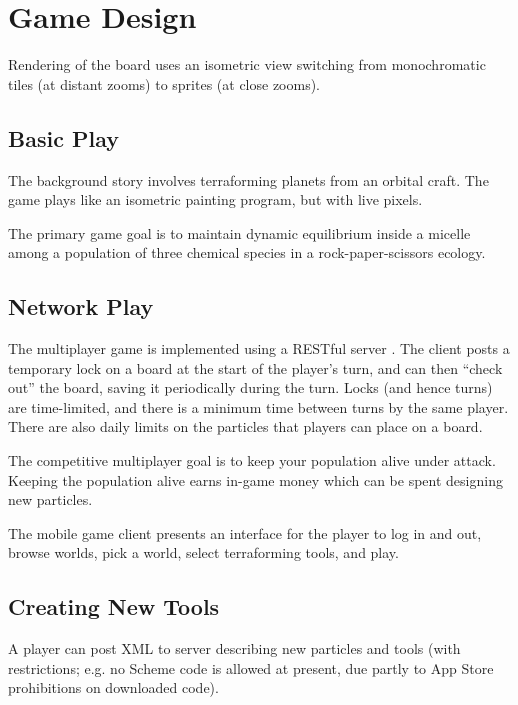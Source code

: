 \documentclass{acm_proc_article-sp}
\begin{document}


\section{Game Design}

Rendering of the board uses an isometric view switching from monochromatic tiles (at distant zooms)
to sprites (at close zooms).

\subsection{Basic Play}

The background story involves terraforming planets from an orbital craft.
The game plays like an isometric painting program, but with live pixels.

The primary game goal is to maintain dynamic equilibrium inside a micelle
among a population of three chemical species in a rock-paper-scissors ecology.

\subsection{Network Play}

The multiplayer game is implemented using a RESTful server \cite{rest}.
The client posts a temporary lock on a board at the start of the player's turn,
and can then ``check out'' the board, saving it periodically during the turn.
Locks (and hence turns) are time-limited, and there is a minimum time between turns by the same player.
There are also daily limits on the particles that players can place on a board.

The competitive multiplayer goal is to keep your population alive under attack.
Keeping the population alive earns in-game money which can be spent designing new particles.

The mobile game client presents an interface for the player to
log in and out, browse worlds, pick a world, select terraforming tools, and play.

\subsection{Creating New Tools}

A player can post XML to server describing new particles and tools
(with restrictions; e.g. no Scheme code is allowed at present,
due partly to App Store prohibitions on downloaded code).
\end{document}
